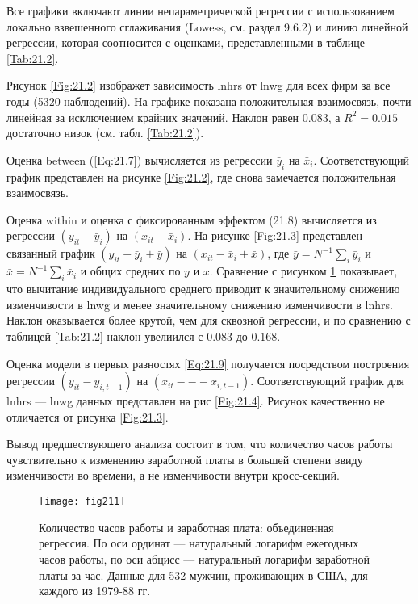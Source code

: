 Все графики включают линии непараметрической регрессии с использованием локально взвешенного сглаживания (Lowess, см. раздел 9.6.2) и линию линейной регрессии, которая соотносится с оценками, представленными в таблице \ref{Tab:21.2}.

Рисунок \ref{Fig:21.2} изображет зависимость lnhrs от lnwg для всех фирм за все годы (5320 наблюдений). На графике показана положительная взаимосвязь, почти линейная за исключением крайних значений. Наклон равен 0.083, а $R^2=0.015$ достаточно низок (см. табл. \ref{Tab:21.2}).

Оценка between (\ref{Eq:21.7}) вычисляется из регрессии $\bar{y}_i$  на $\bar{x}_i$. Соответствующий график представлен на рисунке \ref{Fig:21.2}, где снова замечается положительная взаимосвязь. 

Оценка within и оценка с фиксированным эффектом (21.8) вычисляется из регрессии $(y_{it}-\bar{y}_i)$  на $(x_{it}-\bar{x}_i)$. На рисунке \ref{Fig:21.3} представлен связанный график $(y_{it}-\bar{y}_i+\bar{y})$  на $(x_{it}-\bar{x}_i+\bar{x})$, где $\bar{y}=N^{-1}\sum_{i} \bar{y}_i$ и $\bar{x}=N^{-1} \sum_{i} \bar{x}_i$ и общих средних по $y$ и $x$. Сравнение с рисунком \ref{Fig:21.1} показывает, что вычитание индивидуального среднего приводит к значительному снижению изменчивости в lnwg и менее значительному снижению изменчивости в lnhrs. Наклон оказывается более крутой, чем для сквозной регрессии, и по сравнению с таблицей \ref{Tab:21.2} наклон увелиился с 0.083 до 0.168.

Оценка модели в первых разностях \ref{Eq:21.9} получается посредством построения регрессии $(y_{it}-y_{i,t-1})$ на $(x_{it} --- x_{i,t-1})$. Соответствующий график для lnhrs --- lnwg данных представлен на рис \ref{Fig:21.4}. Рисунок качественно не отличается от рисунка \ref{Fig:21.3}.
 
Вывод предшествующего анализа состоит в том, что количество часов работы чувствительно к изменению заработной платы в большей степени ввиду изменчивости во времени, а не изменчивости внутри кросс-секций.

  \begin{figure}[ht]
                \begin{center}
                    \texttt{[image: fig211]}
                    \caption{Количество часов работы и заработная плата: объединенная регрессия. По оси ординат --- натуральный логарифм ежегодных часов работы, по оси абцисс --- натуральный логарифм заработной платы за час. Данные для 532 мужчин, проживающих в США, для каждого из 1979-88 гг. }
                    \label{Fig:21.1}
                \end{center}
     \end{figure}

